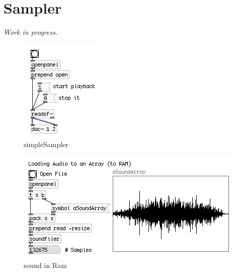 \section{Sampler}

\textit{Work in progress.}

\begin{figure}[H]
	\begin{center}
		\includegraphics[scale = 1]{img/sampler.png}
		\caption{simpleSampler}
		\label{fig:simpleSampler}
	\end{center}
\end{figure}

\begin{figure}[H]
	\begin{center}
		\includegraphics[scale = 1]{img/soundFileToRam.png}
		\caption{sound in Ram}
		\label{fig:soundRam}
	\end{center}
\end{figure}


